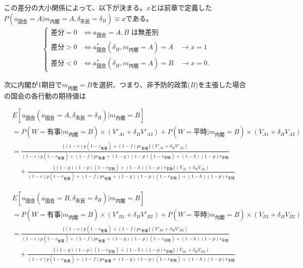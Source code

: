 \documentclass[main.tex]{subfiles}
\begin{document}
\bigskip
この差分の大小関係によって、以下が決まる。$x$とは前章で定義した\\
$P(a_{国会} = A| m_{内閣} = A, \delta_{市民} = \delta_H ) \equiv x$である。
\begin{align*}
    \begin{cases}
         \text{差分} = 0 &\Leftrightarrow \text{$a_{\text{国会}} = A, B$ は無差別} \\
         \text{差分} > 0 &\Leftrightarrow a^*_{\text{国会}}(\delta_H, m_{\text{内閣}} = A) = A \quad\rightarrow x = 1 \\
         \text{差分} < 0 &\Leftrightarrow a^*_{\text{国会}}(\delta_H, m_{\text{内閣}} = A) = B \quad\rightarrow x = 0.
    \end{cases}
\end{align*}





\bigskip
次に内閣が1期目で$m_{内閣}=B$を選択、つまり、非予防的政策($B$)を主張した場合の国会の各行動の期待値は

\begin{align*}
    & E[u_{国会}(a_{国会}=A, \delta_{市民}=\delta_H) | m_{内閣} = B  ]\\[0.5em]
    &= P(W=有事 | m_{内閣}=B) × (V'_{A1} + \delta_H V'_{A2}) + P(W=平時 | m_{内閣}=B) × (V_{A1} + \delta_H V_{A2})\\[0.5em]
    &= \frac{ \{(1-e)p(1-r_{有事}) +  (1-f)pr_{有事}\}(V'_{A1} + \delta_H V'_{A2}) }{ (1-e)p(1-r_{有事}) + (1-f)pr_{有事} + (1-g)(1-p)(1-r_{平時}) + (1-h)(1-p)r_{平時} }\\[1em]
    &\quad + \frac{ \{(1-g)(1-p)(1-r_{平時}) + (1-h)(1-p)r_{平時}\}(V_{A1} + \delta_H V_{A2}) }{ (1-e)p(1-r_{有事}) + (1-f)pr_{有事} + (1-g)(1-p)(1-r_{平時}) + (1-h)(1-p)r_{平時} }
\end{align*}

\begin{align*}
    & E[u_{国会}(a_{国会}=B, \delta_{市民}=\delta_H) | m_{内閣} = B  ]\\[0.5em]
    &= P(W=有事 | m_{内閣}=B) × (V'_{B1} + \delta_H V'_{B2}) + P(W=平時 | m_{内閣}=B) × (V_{B1} + \delta_H V_{B2})\\[0.5em]
    &= \frac{ \{(1-e)p(1-r_{有事}) +  (1-f)pr_{有事}\}(V'_{B1} + \delta_H V'_{B2})  }{ (1-e)p(1-r_{有事}) + (1-f)pr_{有事} + (1-g)(1-p)(1-r_{平時}) + (1-h)(1-p)r_{平時} }\\[1em]
    &\quad + \frac{ \{(1-g)(1-p)(1-r_{平時}) + (1-h)(1-p)r_{平時}\}(V_{B1} + \delta_H V_{B2}) }{ (1-e)p(1-r_{有事}) + (1-f)pr_{有事} + (1-g)(1-p)(1-r_{平時}) + (1-h)(1-p)r_{平時} }
\end{align*}
\end{document}
